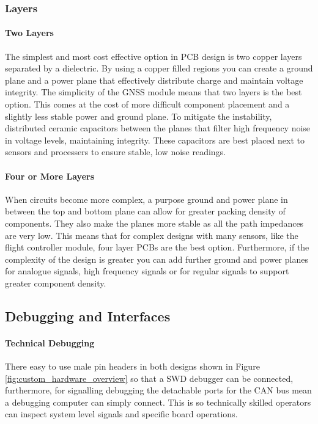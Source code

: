 \subsubsection{Layers}\label{sub_sub_section:tgt_layers}
\paragraph{Two Layers}
The simplest and most cost effective option in \gls{PCB} design is two copper layers separated by a dielectric. By using a copper filled regions you can create a ground plane and a power plane that effectively distribute charge and maintain voltage integrity. The simplicity of the \gls{GNSS} module means that two layers is the best option. This comes at the cost of more difficult component placement and a slightly less stable power and ground plane. To mitigate the instability, distributed ceramic capacitors between the planes that filter high frequency noise in voltage levels, maintaining integrity. These capacitors are best placed next to sensors and processers to ensure stable, low noise readings.
\paragraph{Four or More Layers}
When circuits become more complex, a purpose ground and power plane in between the top and bottom plane can allow for greater packing density of components. They also make the planes more stable as all the path impedances are very low. This means that for complex designs with many sensors, like the flight controller module, four layer \gls{PCB}s are the best option. Furthermore, if the complexity of the design is greater you can add further ground and power planes for analogue signals, high frequency signals or for regular signals to support greater component density.

\subsection{Debugging and Interfaces}\label{sub_sub_section:debugging}
\paragraph{Technical Debugging}
There easy to use male pin headers in both designs shown in Figure \ref{fig:custom_hardware_overview} so that a \gls{SWD} debugger can be connected, furthermore, for signalling debugging the detachable ports for the \gls{CAN} bus mean a debugging computer can simply connect. This is so technically skilled operators can inspect system level signals and specific board operations.
